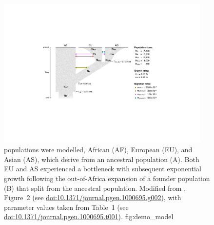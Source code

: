 

\begin{figure}[!htb]
\centering
\includegraphics[width=0.95\textwidth]{./img/ch3/demo_model}
{ populations were modelled, African (AF), European (EU), and Asian (AS), which derive from an ancestral population (A).
Both EU and AS experienced a bottleneck with subsequent exponential growth following the out-of-Africa expansion of a founder population (B) that split from the ancestral population.
Modified from \citet{Gutenkunst:2009gs}, Figure~2 (see \url{doi:10.1371/journal.pgen.1000695.g002}), with parameter values taken from Table~1 (see \url{doi:10.1371/journal.pgen.1000695.t001}).}
{fig:demo_model}
\end{figure}
